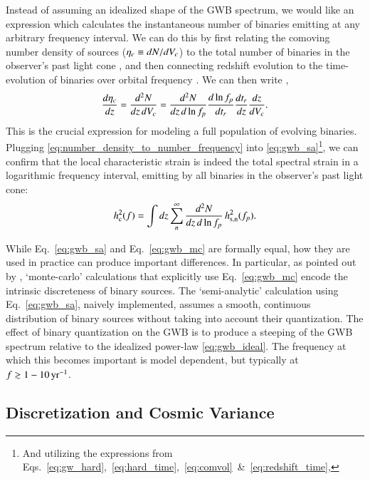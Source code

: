 \documentclass[useAMS, usenatbib]{mnras}
\begin{document}
        Instead of assuming an idealized shape of the GWB spectrum, we would like an expression which calculates the instantaneous number of binaries emitting at any arbitrary frequency interval.  We can do this by first relating the comoving number density of sources ($\eta_c \equiv dN/dV_c$) to the total number of binaries in the observer's past light cone \citep{Haehnelt-1994}, and then connecting redshift evolution to the time-evolution of binaries over orbital frequency \citep{Jaffe+Backer-2003}.  We can then write \citep{Sesana+2008},
        \begin{equation}
            \label{eq:number_density_to_number_frequency}
            \frac{d\eta_c}{dz} = \frac{d^2N}{dz \, dV_c} = \frac{d^2N}{dz \, d\ln f_p} \frac{d \ln f_p}{dt_r} \frac{dt_r}{dz} \frac{dz}{dV_c}.
        \end{equation}
        This is the crucial expression for modeling a full population of evolving binaries.  Plugging \eqref{eq:number_density_to_number_frequency} into \eqref{eq:gwb_sa}\footnote{And utilizing the expressions from Eqs.~\ref{eq:gw_hard},~\ref{eq:hard_time},~\ref{eq:comvol}~\&~\ref{eq:redshift_time},}, we can confirm that the local characteristic strain is indeed the total spectral strain in a logarithmic frequency interval, emitting by all binaries in the observer's past light cone:
        \begin{equation}
            \label{eq:gwb_mc}
                h_{\textrm{c}}^2(f) = \int dz \sum_n^\infty \frac{d^2 N}{dz \, d\ln f_p} \, h_{\textrm{s,n}}^2(f_p).
        \end{equation}

        While Eq.~\ref{eq:gwb_sa} and Eq.~\ref{eq:gwb_mc} are formally equal, how they are used in practice can produce important differences.  In particular, as pointed out by \citep[][Eq.~6]{Sesana+2008}, `monte-carlo' calculations that explicitly use Eq.~\ref{eq:gwb_mc} encode the intrinsic discreteness of binary sources.  The `semi-analytic' calculation using Eq.~\ref{eq:gwb_sa}, naively implemented, assumes a smooth, continuous distribution of binary sources without taking into account their quantization.  The effect of binary quantization on the GWB is to produce a steeping of the GWB spectrum relative to the idealized power-law \eqref{eq:gwb_ideal}.  The frequency at which this becomes important is model dependent, but typically at \mbox{$f \gtrsim 1 - 10 \, \textrm{yr}^{-1}$}.

    \subsection{Discretization and Cosmic Variance}
\end{document}
